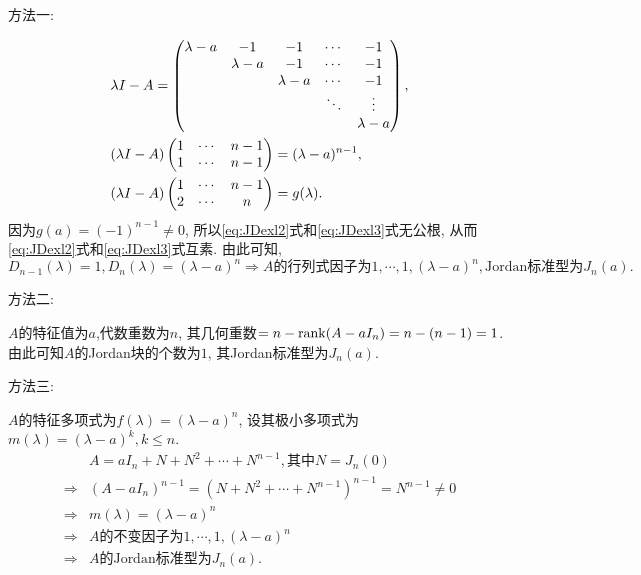 \begin{solution}
  {\heiti 方法一:}

  \begin{align}
    & \lambda I -A =
    \begin{pmatrix}
      \lambda-a & -1 & -1 & \cdots & -1\\
                & \lambda-a & -1 &\cdots & -1\\
                & & \lambda-a & \cdots & -1\\
                & & & \ddots & \vdots\\
      &&&&\lambda-a
    \end{pmatrix},\notag\\
    & (\lambda I-A)
    \begin{pmatrix}
      1&\cdots&n-1\\
      1&\cdots&n-1
    \end{pmatrix}=(\lambda-a)^{n-1},\label{eq:JDexl2}\\
    & (\lambda I-A)
    \begin{pmatrix}
      1&\cdots&n-1\\
      2&\cdots&n
    \end{pmatrix}=g(\lambda).\label{eq:JDexl3}
  \end{align}
  因为$g(a)=(-1)^{n-1}\neq 0$,
  所以\eqref{eq:JDexl2}式和\eqref{eq:JDexl3}式无公根,
  从而\eqref{eq:JDexl2}式和\eqref{eq:JDexl3}式互素.
  由此可知,
  \[ D_{n-1}(\lambda)=1, D_n(\lambda)=(\lambda-a)^n \Longrightarrow
    A\text{的行列式因子为}1,\cdots,1,(\lambda-a)^n, \text{Jordan标准型为}J_n(a).
  \]

  {\heiti 方法二:}

  $A$的特征值为$a$,代数重数为$n$,
  其几何重数$=n-\operatorname{rank}(A-aI_n)=n-(n-1)=1$.
  由此可知$A$的Jordan块的个数为$1$,
  其Jordan标准型为$J_n(a)$.

  {\heiti 方法三:}

  $A$的特征多项式为$f(\lambda)=(\lambda-a)^n$,
  设其极小多项式为$m(\lambda)=(\lambda-a)^k, k \leq n$.
  \begin{align*}
    & A=aI_n+N+N^2+\cdots+N^{n-1}, \text{其中} N=J_n(0)\\
    \Longrightarrow & (A-aI_n)^{n-1}=(N+N^2+\cdots+N^{n-1})^{n-1}=N^{n-1}\neq 0\\
    \Longrightarrow & m(\lambda)=(\lambda-a)^n\\
    \Longrightarrow & A\text{的不变因子为}1,\cdots,1,(\lambda-a)^n\\
    \Longrightarrow & A\text{的Jordan标准型为}J_n(a).
  \end{align*}
\end{solution}

